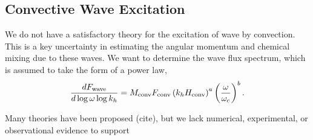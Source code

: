 {\color{purple}
\subsection{Convective Wave Excitation}
}

We do not have a satisfactory theory for the excitation of wave by convection. This is a key uncertainty in estimating the angular momentum and chemical mixing due to these waves. We want to determine the wave flux spectrum, which is assumed to take the form of a power law,
\begin{equation}
\frac{d F_{\rm wave}}{d\log \omega \log k_h} = M_{\rm conv}F_{\rm conv} \left(k_h H_{\rm conv}\right)^{a} \left(\frac{\omega}{\omega_c}\right)^{b}.
\end{equation}

Many theories have been proposed (cite), but we lack numerical, experimental, or observational evidence to support  
